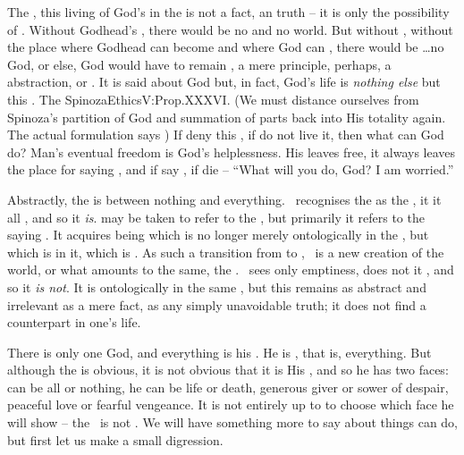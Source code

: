 %
The , this living  of God's in the
 is not a fact, an  truth -- it is only the possibility
of \yes.  Without Godhead's , there would be no  and no
world.  But without , without the place where Godhead can become
 and where God can , there would be \ldots no God, or
else, God would have to remain , a mere principle, perhaps, a
 abstraction,  or .
It is said about God  but, in
fact, God's life is {\em nothing else} but this .  The
\citet{intellectual love of the mind toward God is the love with which God loves
  Himself.}{SpinozaEthics}{V:Prop.XXXVI. (We must distance ourselves from
  Spinoza's partition of God and summation of parts back into His totality
  again. The actual formulation says )}  If  deny this , if  do not live it,
then what can God do?  Man's eventual freedom is God's helplessness. His
 leaves  free, it always leaves the place for saying \No, and
if  say \No, if  die -- ``What will you do, God?  I am worried.''

\pa\label{pa:twoFaces} Abstractly, the  is between nothing and
everything. \Yes\ recognises the  as the , it
 it  all , and so it {\em is}.
 may be taken to refer to the , but primarily it refers to the
 saying \yes.  It acquires being which is no longer merely
ontologically  in the , but which is 
in it, which is .  As such a transition from
 to , \yes\ is a new creation of the world, or what
amounts to the same, the .  \No\ sees only emptiness, does not
 it , and so it {\em is not}.  It is
ontologically  in the same , but this 
remains as abstract and irrelevant as a mere fact, as any simply unavoidable
truth; it does not find a  counterpart in one's life.

There is only one God, and everything is his .  He is
, that is, everything. But although the  
 is obvious, it is not obvious that it is His , and so
he has two faces:  can be all or nothing, he can be life or
death, generous giver or sower of despair, peaceful love or 
fearful vengeance. It is not entirely up to  to choose which face he
will show -- the \sch\ is not . We will have something more to say 
about things  can do, but first let us make a small digression.


